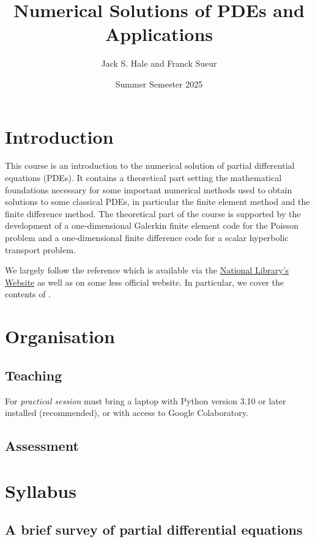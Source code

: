 \documentclass{article}
\title{Numerical Solutions of PDEs and Applications}
\author{Jack S. Hale and Franck Sueur}
\date{Summer Semester 2025}
\begin{document}
\maketitle

\section{Introduction}

This course is an introduction to the numerical solution of partial
differential equations (PDEs). It contains a theoretical part setting the
mathematical foundations necessary for some important numerical methods used to
obtain solutions to some classical PDEs, in particular the finite element
method and the finite difference method. The theoretical part of the course is
supported by the development of a one-dimensional Galerkin finite element code
for the Poisson problem and a one-dimensional finite difference code for a
scalar hyperbolic transport problem.

We largely follow the reference \cite{Q} which is available via the
\href{https://a-z.lu}{National Library's Website} as well as on some less
official website. In particular, we cover the contents of \cite[Chapters 1, 2,
3, 4, and 14]{Q}.

\section{Organisation}

\subsection{Teaching}

For \emph{practical session} must bring a laptop with Python version 3.10 or
later installed (recommended), or with access to Google Colaboratory.

\subsection{Assessment}

\section{Syllabus}

\subsection{A brief survey of partial differential equations}
\end{document}
